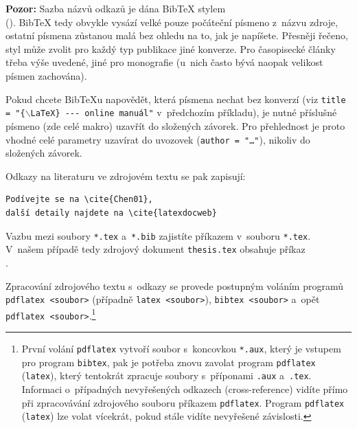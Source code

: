 \documentclass[11pt,twoside,a4paper]{book}
\begin{document}
\textbf{Pozor:} Sazba názvů odkazů je dána Bib\TeX{} stylem\\ (\verb||). 
Bib\TeX{} tedy obvykle vysází velké pouze počáteční písmeno z~názvu zdroje, 
ostatní písmena zůstanou malá bez ohledu na to, jak je napíšete. 
Přesněji řečeno, styl může zvolit pro každý typ publikace jiné konverze. 
Pro časopisecké články třeba výše uvedené, jiné pro monografie (u~nich často bývá 
naopak velikost písmen zachována).

Pokud chcete Bib\TeX u napovědět, která písmena nechat bez konverzí 
(viz \texttt{title = "\{$\backslash$LaTeX\} -{}-{}- online manuál"} 
v~předchozím příkladu), je nutné příslušné písmeno (zde celé makro) uzavřít 
do složených závorek. Pro přehlednost je proto vhodné celé parametry 
uzavírat do uvozovek (\texttt{author = "\dots"}), nikoliv do složených závorek.

Odkazy na literaturu ve zdrojovém textu se pak zapisují:
\begin{verbatim}
Podívejte se na \cite{Chen01}, 
další detaily najdete na \cite{latexdocweb}
\end{verbatim}

Vazbu mezi soubory \verb|*.tex| a~\verb|*.bib| zajistíte příkazem 
\verb|| v~souboru \verb|*.tex|.  V~našem případě tedy zdrojový 
dokument \verb|thesis.tex| obsahuje příkaz\\
\verb||.

Zpracování zdrojového textu s~odkazy se provede postupným voláním programů\\
\verb|pdflatex <soubor>| (případně \verb|latex <soubor>|), \verb|bibtex <soubor>| 
a~opět\\ \verb|pdflatex <soubor>|.\footnote{První volání \texttt{pdflatex} 
vytvoří soubor s~koncovkou \texttt{*.aux}, který je vstupem pro program 
\texttt{bibtex}, pak je potřeba znovu zavolat program \texttt{pdflatex} 
(\texttt{latex}), který tentokrát zpracuje soubory s~příponami \texttt{.aux}
a~\texttt{.tex}. 
Informaci o~případných nevyřešených odkazech (cross-reference) vidíte přímo při 
zpracovávání zdrojového souboru příkazem \texttt{pdflatex}. Program \texttt{pdflatex} 
(\texttt{latex}) lze volat vícekrát, pokud stále vidíte nevyřešené závislosti.}
\end{document}
